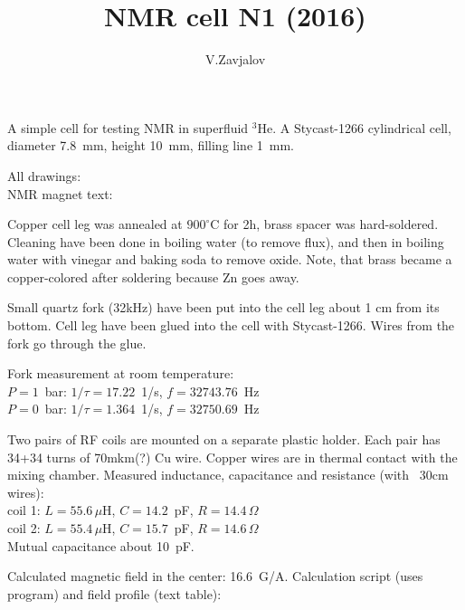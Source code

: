\documentclass[a4paper]{article}
\title{NMR cell N1 (2016)}
\author{V.Zavjalov}
\begin{document}
\maketitle

A simple cell for testing NMR in superfluid $^3$He. A Stycast-1266 cylindrical cell,
diameter 7.8~mm, height 10~mm, filling line 1~mm.

All drawings: \\
NMR magnet text: 



Copper cell leg was annealed at $900^\circ$C for 2h, brass spacer was
hard-soldered. Cleaning have been done in boiling water (to remove flux),
and then in boiling water with vinegar and baking soda to remove oxide. Note,
that brass became a copper-colored after soldering because Zn goes away.

Small quartz fork (32kHz) have been put into the cell leg about 1 cm from
its bottom. Cell leg have been glued into the cell with Stycast-1266.
Wires from the fork go through the glue.

Fork measurement at room temperature:\\
$P=1$~bar: $1/\tau=17.22$~1/s, $f=32743.76$~Hz\\
$P=0$~bar: $1/\tau=1.364$~1/s, $f=32750.69$~Hz


Two pairs of RF coils are mounted on a separate plastic holder. Each pair has 34+34 turns
of 70mkm(?) Cu wire. Copper wires are in thermal contact with the mixing chamber.
Measured inductance, capacitance and resistance (with ~30cm wires):\\
coil 1: $L = 55.6\,\mu$H, $C = 14.2$~pF, $R = 14.4\,\Omega$\\
coil 2: $L = 55.4\,\mu$H,  $C = 15.7$~pF,  $R = 14.6\,\Omega$\\
Mutual capacitance about 10~pF.

Calculated magnetic field in the center: 16.6~G/A.
Calculation script (uses \MagnettiProg{} program) and field profile (text table):


\end{document}
